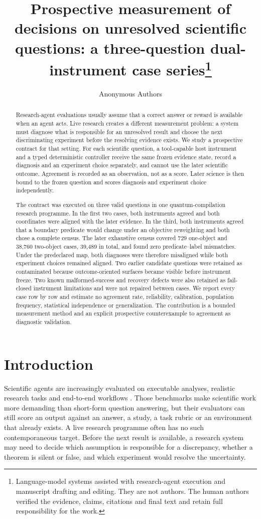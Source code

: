 \documentclass[10pt]{article}
\title{Prospective measurement of decisions on unresolved scientific questions:
a three-question dual-instrument case series\thanks{Language-model systems assisted with research-agent execution and manuscript drafting and editing. They are not authors. The human authors verified the evidence, claims, citations and final text and retain full responsibility for the work.}}
\author{Anonymous Authors}
\date{}
\begin{document}
\maketitle

\begin{abstract}
Research-agent evaluations usually assume that a correct answer or reward is available when an agent acts. Live research creates a different measurement problem: a system must diagnose what is responsible for an unresolved result and choose the next discriminating experiment before the resolving evidence exists. We study a prospective contract for that setting. For each scientific question, a tool-capable host instrument and a typed deterministic controller receive the same frozen evidence state, record a diagnosis and an experiment choice separately, and cannot use the later scientific outcome. Agreement is recorded as an observation, not as a score. Later science is then bound to the frozen question and scores diagnosis and experiment choice independently.

The contract was executed on three valid questions in one quantum-compilation research programme. In the first two cases, both instruments agreed and both coordinates were aligned with the later evidence. In the third, both instruments agreed that a boundary predicate would change under an objective reweighting and both chose a complete census. The later exhaustive census covered 729 one-object and 38,760 two-object cases, 39,489 in total, and found zero predicate--label mismatches. Under the predeclared map, both diagnoses were therefore misaligned while both experiment choices remained aligned. Two earlier candidate questions were retained as contaminated because outcome-oriented surfaces became visible before instrument freeze. Two known malformed-success and recovery defects were also retained as fail-closed instrument limitations and were not repaired between cases. We report every case row by row and estimate no agreement rate, reliability, calibration, population frequency, statistical independence or generalization. The contribution is a bounded measurement method and an explicit prospective counterexample to agreement as diagnostic validation.
\end{abstract}

\section{Introduction}

Scientific agents are increasingly evaluated on executable analyses, realistic research tasks and end-to-end workflows \citep{chen2025scienceagentbench,bragg2025astabench,meng2026scientistone,liu2026sciagentarena,panigrahi2026heurekabench}. Those benchmarks make scientific work more demanding than short-form question answering, but their evaluators can still score an output against an answer, a study, a task rubric or an environment that already exists. A live research programme often has no such contemporaneous target. Before the next result is available, a research system may need to decide which assumption is responsible for a discrepancy, whether a theorem is silent or false, and which experiment would resolve the uncertainty.
\end{document}
